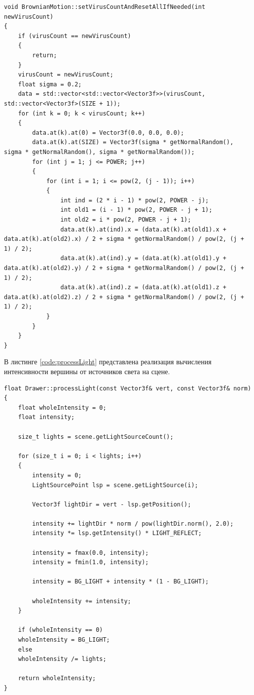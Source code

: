 \newpage

\begin{lstlisting}[label=code:brown,caption=Реализация вычисления изменения координат центров частиц (броуновское движение)]
void BrownianMotion::setVirusCountAndResetAllIfNeeded(int newVirusCount)
{
	if (virusCount == newVirusCount)
	{
		return;
	}
	virusCount = newVirusCount;
	float sigma = 0.2;
	data = std::vector<std::vector<Vector3f>>(virusCount, std::vector<Vector3f>(SIZE + 1));
	for (int k = 0; k < virusCount; k++)
	{
		data.at(k).at(0) = Vector3f(0.0, 0.0, 0.0);
		data.at(k).at(SIZE) = Vector3f(sigma * getNormalRandom(), sigma * getNormalRandom(), sigma * getNormalRandom());
		for (int j = 1; j <= POWER; j++)
		{
			for (int i = 1; i <= pow(2, (j - 1)); i++)
			{
				int ind = (2 * i - 1) * pow(2, POWER - j);
				int old1 = (i - 1) * pow(2, POWER - j + 1);
				int old2 = i * pow(2, POWER - j + 1);
				data.at(k).at(ind).x = (data.at(k).at(old1).x + data.at(k).at(old2).x) / 2 + sigma * getNormalRandom() / pow(2, (j + 1) / 2);
				data.at(k).at(ind).y = (data.at(k).at(old1).y + data.at(k).at(old2).y) / 2 + sigma * getNormalRandom() / pow(2, (j + 1) / 2);
				data.at(k).at(ind).z = (data.at(k).at(old1).z + data.at(k).at(old2).z) / 2 + sigma * getNormalRandom() / pow(2, (j + 1) / 2);
			}
		}
	}
}
\end{lstlisting}

В листинге \ref{code:processLight} представлена реализация вычисления интенсивности вершины от источников света на сцене.

\begin{lstlisting}[label=code:processLight,caption=Реализация вычисления интенсивности вершины]
float Drawer::processLight(const Vector3f& vert, const Vector3f& norm)
{
	float wholeIntensity = 0;
	float intensity;
	
	size_t lights = scene.getLightSourceCount();
	
	for (size_t i = 0; i < lights; i++)
	{
		intensity = 0;
		LightSourcePoint lsp = scene.getLightSource(i);
		
		Vector3f lightDir = vert - lsp.getPosition();
		
		intensity += lightDir * norm / pow(lightDir.norm(), 2.0);
		intensity *= lsp.getIntensity() * LIGHT_REFLECT;
		
		intensity = fmax(0.0, intensity);
		intensity = fmin(1.0, intensity);
		
		intensity = BG_LIGHT + intensity * (1 - BG_LIGHT);
		
		wholeIntensity += intensity;
	}
	
	if (wholeIntensity == 0)
	wholeIntensity = BG_LIGHT;
	else
	wholeIntensity /= lights;
	
	return wholeIntensity;
}
\end{lstlisting}


